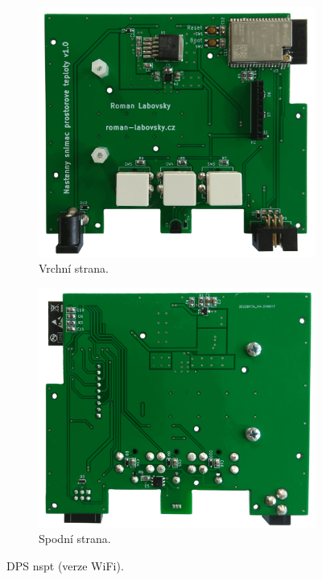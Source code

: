 \begin{figure}[H]
\centering
\begin{subfigure}{.5\textwidth}
  \centering
    \includegraphics[width=\textwidth]{images/nastenny-snimac-prostorove-teploty-wifi/dps-nastenny-snimac-prostorove-teploty-wifi-vrchni-cast.png}
    \caption{Vrchní strana.}
    \label{fig:dps-nastenny-snimac-prostorove-teploty-wifi-vrchni-cast}
\end{subfigure}%
\begin{subfigure}{.5\textwidth}
  \centering
    \includegraphics[width=\textwidth]{images/nastenny-snimac-prostorove-teploty-wifi/dps-nastenny-snimac-prostorove-teploty-wifi-spodni-cast.png}
    \caption{Spodní strana.}
    \label{fig:dps-nastenny-snimac-prostorove-teploty-wifi-spodni-cast}
\end{subfigure}
\caption{DPS \acrshort{nspt} (verze WiFi).}
\label{fig:dps-nastenny-snimac-prostorove-teploty-wifi}
\end{figure}


